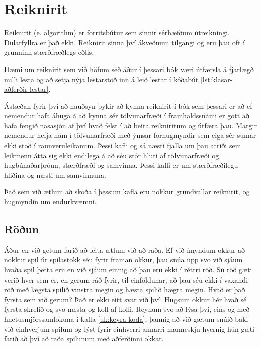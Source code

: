 
\chapter{Reiknirit}\label{k:reiknirit}
Reiknirit (e. algorithm) er forritsbútur sem sinnir sérhæfðum útreikningi.
Dularfyllra er það ekki.
Reiknirit sinna því ákveðnum tilgangi og eru þau oft í grunninn stærðfræðlegs eðlis.

Dæmi um reiknirit sem við höfum séð áður í þessari bók væri útfærsla á fjarlægð milli lesta og að setja nýja lestarstöð inn á leið lestar í kóðabút \ref{lst:klasar-aðferðir-lestar}.

Ástæðan fyrir því að nauðsyn þykir að kynna reiknirit í bók sem þessari er að ef nemendur hafa áhuga á að kynna sér tölvunarfræði í framhaldssnámi er gott að hafa fengið nasasjón af því hvað felst í að beita reikniritum og útfæra þau.
Margir nemendur hefja nám í tölvunarfræði með ýmsar forhugmyndir sem eiga sér sumar ekki stoð í raunveruleikanum.
Þessi kafli og sá næsti fjalla um þau atriði sem leikmenn átta sig ekki endilega á að séu stór hluti af tölvunarfræði og hugbúnaðarþróun; stærðfræði og samvinna.
Þessi kafli er um stærðfræðilegu hliðina og næsti um samvinnuna.

Það sem við ætlum að skoða í þessum kafla eru nokkur grundvallar reiknirit, og hugmyndin um endurkvæmni.





\section{Röðun}\label{uk:reiknirit-röðun}
Áður en við getum farið að leita ætlum við að raða.
Ef við ímyndum okkur að nokkur spil úr spilastokk séu fyrir framan okkur, þau snúa upp svo við sjáum hvaða spil þetta eru en við sjáum einnig að þau eru ekki í réttri röð.
Sú röð gæti verið hver sem er, en gerum ráð fyrir, til einföldunar, að þau séu ekki í vaxandi röð með lægsta spilið vinstra megin og hæsta spilið hægra megin.
Hvað er það fyrsta sem við gerum?
Það er ekki eitt svar við því.
Hugsum okkur hér hvað sé fyrsta skrefið og svo næsta og koll af kolli.
Reynum svo að lýsa því, eins og með hnetusmjörssamlokuna í kafla \ref{uk:keyra-koda}, þannig að við gætum snúið baki við einhverjum spilum og lýst fyrir einhverri annarri manneskju hvernig hún gæti farið að því að raða spilunum með aðferðinni okkar.

